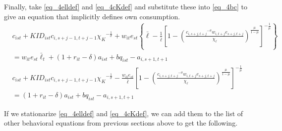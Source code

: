 \documentclass[letterpaper,12pt]{article}
\theoremstyle{definition}
\numberwithin{equation}{section}
\begin{document}
\begin{spacing}{1.5}
	Finally, take \eqref{eq_4elldef} and \eqref{eq_4cKdef} and substitute these into \eqref{eq_4bc} to give an equation that implicitly defines own consumption.
	\begin{align}
		& c_{ist} + KID_{ist}c_{i,s+j-1,t+j-1} {\chi_K}^{-\frac{1}{\sigma}} + w_{it} e_{st} \left\{ \bar \ell - \frac{1}{\bar \ell} \left[ 1-\left(\frac{{c_{i,s+j,t+j}}^{-\sigma} w_{i,t+j} e_{s+j,t+j}}{\chi_\ell} \right)^{\frac{\mu}{1-\mu}} \right]^{-\frac{1}{\mu}} \right\} \nonumber \\
		& = w_{it} e_{st} \bar \ell_t + (1+r_{it}-\delta)a_{ist} + bq_{ist} - a_{i,s+1,t+1} \nonumber \\
		& c_{ist} + KID_{ist}c_{i,s+j-1,t+j-1} {\chi_K}^{-\frac{1}{\sigma}} -  \frac{w_{it} e_{st}}{\bar \ell} \left[ 1-\left(\frac{{c_{i,s+j,t+j}}^{-\sigma} w_{i,t+j} e_{s+j,t+j}}{\chi_\ell} \right)^{\frac{\mu}{1-\mu}} \right]^{-\frac{1}{\mu}} \nonumber \\
		& = (1+r_{it}-\delta)a_{ist} + bq_{ist} - a_{i,s+1,t+1} \label{eq_4cdef}
	\end{align}

	If we stationarize \eqref{eq_4elldef} and \eqref{eq_4cKdef}, we can add them to the list of other behavioral equations from previous sections above to get the following.


\end{spacing}
\end{document}
